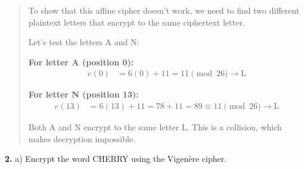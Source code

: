 \documentclass[12pt]{article}
\begin{document}
\begin{quote}
To show that this affine cipher doesn't work, we need to find two different plaintext letters that encrypt to the same ciphertext letter.

Let's test the letters A and N:

\vspace{0.3cm}

\textbf{For letter A (position 0):}
\begin{align*}
e(0) &= 6(0) + 11 = 11 \pmod{26} \rightarrow \text{L}
\end{align*}

\textbf{For letter N (position 13):}
\begin{align*}
e(13) &= 6(13) + 11 = 78 + 11 = 89 \equiv 11 \pmod{26} \rightarrow \text{L}
\end{align*}

Both A and N encrypt to the same letter L. This is a collision, which makes decryption impossible.

\vspace{0.5cm}

\end{quote}


\noindent\textbf{2.} a) Encrypt the word CHERRY using the Vigenère cipher.

\vspace{0.5cm}
\end{document}
